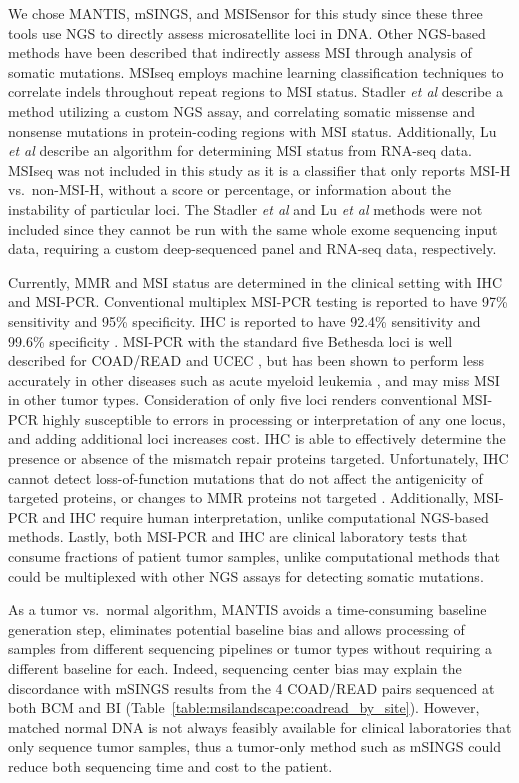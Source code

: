 We chose MANTIS, mSINGS, and MSISensor for this study since these three tools use NGS to directly assess microsatellite loci in DNA\@. Other NGS-based methods have been described that indirectly assess MSI through analysis of somatic mutations. MSIseq \cite{nihuang2015} employs machine learning classification techniques to correlate indels throughout repeat regions to MSI status. Stadler \textit{et al} \cite{stadler2016} describe a method utilizing a custom NGS assay, and correlating somatic missense and nonsense mutations in protein-coding regions with MSI status. Additionally, Lu \textit{et al} \cite{lu2013} describe an algorithm for determining MSI status from RNA-seq data. MSIseq was not included in this study as it is a classifier that only reports MSI-H vs.\ non-MSI-H, without a score or percentage, or information about the instability of particular loci. The Stadler \textit{et al} and Lu \textit{et al} methods were not included since they cannot be run with the same whole exome sequencing input data, requiring a custom deep-sequenced panel and RNA-seq data, respectively.

Currently, MMR and MSI status are determined in the clinical setting with IHC and MSI-PCR\@. Conventional multiplex MSI-PCR testing is reported to have 97\% sensitivity and 95\% specificity. IHC is reported to have 92.4\% sensitivity and 99.6\% specificity \cite{zhang2013}. MSI-PCR with the standard five Bethesda loci is well described for COAD/READ and UCEC \cite{armaghany2012}, but has been shown to perform less accurately in other diseases such as acute myeloid leukemia \cite{faulkner2004}, and may miss MSI in other tumor types. Consideration of only five loci renders conventional MSI-PCR highly susceptible to errors in processing or interpretation of any one locus, and adding additional loci increases cost. IHC is able to effectively determine the presence or absence of the mismatch repair proteins targeted. Unfortunately, IHC cannot detect loss-of-function mutations that do not affect the antigenicity of targeted proteins, or changes to MMR proteins not targeted \cite{shia2015}. Additionally, MSI-PCR and IHC require human interpretation, unlike computational NGS-based methods. Lastly, both MSI-PCR and IHC are clinical laboratory tests that consume fractions of patient tumor samples, unlike computational methods that could be multiplexed with other NGS assays for detecting somatic mutations.

As a tumor vs.\ normal algorithm, MANTIS avoids a time-consuming baseline generation step, eliminates potential baseline bias and allows processing of samples from different sequencing pipelines or tumor types without requiring a different baseline for each. Indeed, sequencing center bias may explain the discordance with mSINGS results from the 4 COAD/READ pairs sequenced at both BCM and BI (Table~\ref{table:msilandscape:coadread_by_site}). However, matched normal DNA is not always feasibly available for clinical laboratories that only sequence tumor samples, thus a tumor-only method such as mSINGS could reduce both sequencing time and cost to the patient.

